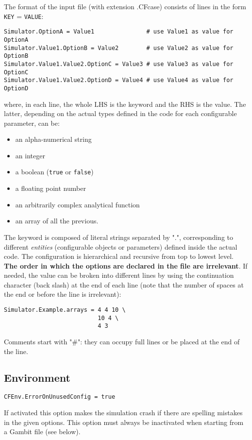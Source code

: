 \documentclass[11pt]{article}
\begin{document}
The format of the input file (with extension .CFcase) consists of lines in the form {\tt KEY} = {\tt VALUE}:
\vspace{-0.2cm}
\begin{lstlisting}[breaklines]
Simulator.OptionA = Value1               # use Value1 as value for OptionA
Simulator.Value1.OptionB = Value2        # use Value2 as value for OptionB
Simulator.Value1.Value2.OptionC = Value3 # use Value3 as value for OptionC
Simulator.Value1.Value2.OptionD = Value4 # use Value4 as value for OptionD
\end{lstlisting} 
where, in each line, the whole LHS is the keyword and the RHS is the value. The
latter, depending on the actual types defined in the code for each configurable parameter, can be:

\begin{itemize}
\item
  an alpha-numerical string
\item
  an integer
\item 
  a boolean (\texttt{true} or \texttt{false})
\item
  a floating point number
\item
  an arbitrarily complex analytical function
\item
  an array of all the previous.
\end{itemize}
The keyword is composed of literal strings separated by ".",
corresponding to different \textit{entities} (configurable
objects or parameters) defined inside the actual code. The
configuration is hierarchical and recursive from top to lowest
level. {\bf The order in which the options are declared in the file are
  irrelevant}. If needed, the value can be broken into different lines by using the continuation character (back slash) 
at the end of each line (note that the number of spaces at the end or
before the line is irrelevant):
\vspace{-0.2cm}
\begin{lstlisting}[breaklines]
Simulator.Example.arrays = 4 4 10 \
                           10 4 \
                           4 3
\end{lstlisting}
Comments start with "\#": they can occupy full lines or be placed at the end of the line.

\subsection{Environment}

\begin{lstlisting}[breaklines]
CFEnv.ErrorOnUnusedConfig = true
\end{lstlisting}
If activated this option makes the simulation crash if there are spelling mistakes in the given options.
This option must always be inactivated when starting from a Gambit file (see below).
\end{document}
